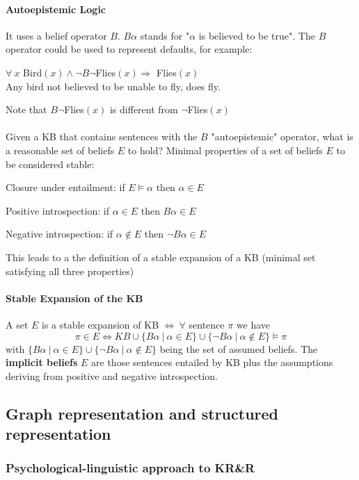 \documentclass[10pt]{report}
\begin{document}
\paragraph{Autoepistemic Logic} It uses a belief operator $B$. $B\alpha$ stands for "$\alpha$ is believed to be true". The $B$ operator could be used to represent defaults, for example:
\begin{list}{}{}
	\item $\forall\:x$ Bird$(x) \wedge\neg B\neg$Flies$(x)\Rightarrow$ Flies$(x)$\\
	Any bird not believed to be unable to fly, does fly.
\end{list}
Note that $B\neg$Flies$(x)$ is different from $\neg$Flies$(x)$\\\\
Given a KB that contains sentences with the $B$ "autoepistemic" operator, what is a reasonable set of beliefs $E$ to hold? Minimal properties of a set of beliefs $E$ to be considered stable:
\begin{list}{}{}
	\item Closure under entailment: if $E\vDash\alpha$ then $\alpha\in E$
	\item Positive introspection: if $\alpha\in E$ then $B\alpha\in E$
	\item Negative introspection: if $\alpha\not\in E$ then $\neg B\alpha\in E$
\end{list}
This leads to a the definition of a stable expansion of a KB (minimal set satisfying all three properties)
\paragraph{Stable Expansion of the KB} A set $E$ is a stable expansion of KB $\Leftrightarrow\:\forall$ sentence $\pi$ we have
$$\pi\in E \Leftrightarrow KB\cup\{B\alpha\:|\:\alpha\in E\}\cup\{\neg B\alpha\:|\:\alpha\not\in E\}\vDash\pi$$
with $\{B\alpha\:|\:\alpha\in E\}\cup\{\neg B\alpha\:|\:\alpha\not\in E\}$ being the set of assumed beliefs. The \textbf{implicit beliefs} $E$ are those sentences entailed by KB plus the assumptions deriving from positive and negative introspection.
\subsection{Graph representation and structured representation}
\subsubsection{Psychological-linguistic approach to KR\&R}
\end{document}
